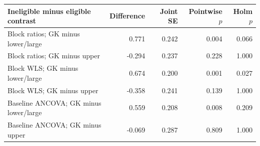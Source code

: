 \begin{tabular}{lrrrr}
\toprule
Ineligible minus eligible contrast & Difference & Joint SE & Pointwise $p$ & Holm $p$\\
\midrule
Block ratios; GK minus lower/large & 0.771 & 0.242 & 0.004 & 0.066\\
Block ratios; GK minus upper & -0.294 & 0.237 & 0.228 & 1.000\\
Block WLS; GK minus lower/large & 0.674 & 0.200 & 0.001 & 0.027\\
Block WLS; GK minus upper & -0.358 & 0.241 & 0.139 & 1.000\\
Baseline ANCOVA; GK minus lower/large & 0.559 & 0.208 & 0.008 & 0.209\\
Baseline ANCOVA; GK minus upper & -0.069 & 0.287 & 0.809 & 1.000\\
\bottomrule
\end{tabular}
